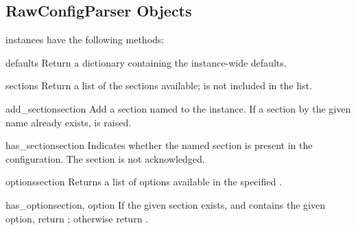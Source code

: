 \begin{seealso}
\end{seealso}


\subsection{RawConfigParser Objects \label{RawConfigParser-objects}}

 instances have the following methods:

\begin{methoddesc}{defaults}{}
Return a dictionary containing the instance-wide defaults.
\end{methoddesc}

\begin{methoddesc}{sections}{}
Return a list of the sections available;  is not
included in the list.
\end{methoddesc}

\begin{methoddesc}{add_section}{section}
Add a section named  to the instance.  If a section by
the given name already exists,  is
raised.
\end{methoddesc}

\begin{methoddesc}{has_section}{section}
Indicates whether the named section is present in the
configuration. The  section is not acknowledged.
\end{methoddesc}

\begin{methoddesc}{options}{section}
Returns a list of options available in the specified .
\end{methoddesc}

\begin{methoddesc}{has_option}{section, option}
If the given section exists, and contains the given option,
return ; otherwise return .
\end{methoddesc}

